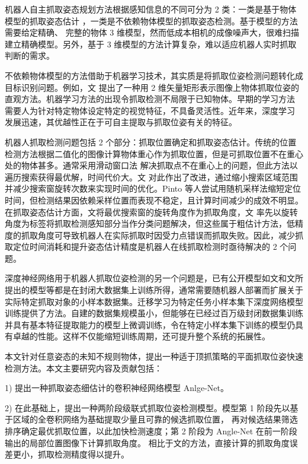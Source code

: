 \documentclass[no-math,bwprint]{YangThesis}
\begin{document}
机器人自主抓取姿态规划方法根据感知信息的不同可分为 2 类：一类是基于物体模型的抓取姿态估计 \cite{bibb1,bibb2,bibb3}，一类是不依赖物体模型的抓取姿态检测。基于模型的方法需要给定精确、 完整的物体 3 维模型，然而低成本相机的成像噪声大，很难扫描建立精确模型。另外，基于 3 维模型的方法计算复杂，难以适应机器人实时抓取判断的需求。

不依赖物体模型的方法借助于机器学习技术，其实质是将抓取位姿检测问题转化成目标识别问题。例如，文 \cite{bibb4} 提出了一种用 2 维矢量矩形表示图像上物体抓取位姿的直观方法。机器学习方法的出现令抓取检测不局限于已知物体。早期的学习方法 \cite{bibb4} 需要人为针对特定物体设定特定的视觉特征，不具备灵活性。近年来，深度学习 \cite{bibb5} 发展迅速，其优越性正在于可自主提取与抓取位姿有关的特征。 

机器人抓取检测问题包括 2 个部分：抓取位置确定和抓取姿态估计。传统的位置检测方法根据二值化的图像计算物体重心作为抓取位置，但是可抓取位置不在重心处的物体甚多。通常采用滑动窗口法\cite{bibb6,bibb7} 解决抓取点不在重心上的问题，但此方法以遍历搜索获得最优解，时间代价大。文\cite{bibb8} 对此作出了改进，通过缩小搜索区域范围并减少搜索窗旋转次数来实现时间的优化。Pinto 等人\cite{bibb9}尝试用随机采样法缩短定位时间，但检测结果因依赖采样位置而表现不稳定，且计算时间减少的成效不明显。 在抓取姿态估计方面，文\cite{bibb7,bibb10}将最优搜索窗的旋转角度作为抓取角度，文\cite{bibb9} 率先以旋转角度为标签将抓取检测感知部分当作分类问题解决，但这些属于粗估计方法，低精度的抓取角度可导致机器人在实际抓取时因受力点错误而抓取失败。因此，减少抓取定位时间消耗和提升姿态估计精度是机器人在线抓取检测时亟待解决的 2 个问题。

深度神经网络用于机器人抓取位姿检测的另一个问题是，已有公开模型如文\cite{bibb7}和文\cite{bibb11}所提出的模型等都是在封闭大数据集上训练所得，通常需要随机器人部署而扩展关于实际特定抓取对象的小样本数据集。迁移学习为特定任务小样本集下深度网络模型训练提供了方法。自建的数据集规模虽小，但能够在已经过百万级封闭数据集训练并具有基本特征提取能力的模型上微调训练，令在特定小样本集下训练的模型仍具有卓越的性能。这样不仅能缩短训练周期，还可提升整个系统的拓展性。

本文针对任意姿态的未知不规则物体，提出一种适于顶抓策略的平面抓取位姿快速检测方法。本文主要研究内容及贡献包括：

1) 提出一种抓取姿态细估计的卷积神经网络模型 Anlge-Net。

2) 在此基础上，提出一种两阶段级联式抓取位姿检测模型。模型第 1 阶段先以基于区域的全卷积网络\cite{bibb12}为基础提取少量且可靠的候选抓取位置， 再对候选结果筛选排序确定最优抓取位置，以此加快检测速度；第 2 阶段为 Angle-Net 在前一阶段输出的局部位置图像下计算抓取角度。 相比于文\cite{bibb9}的方法，直接计算的抓取角度误差更小，抓取检测精度得以提升。
\end{document}

